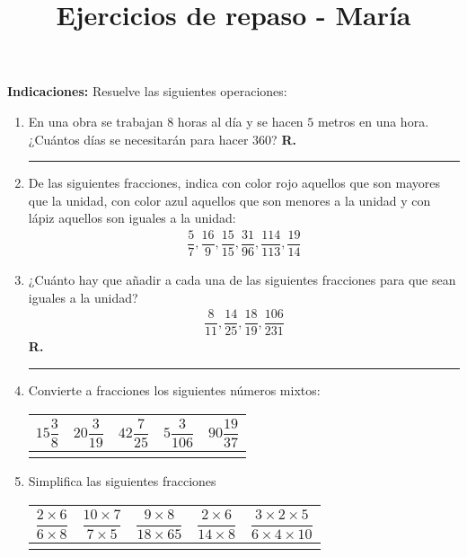 

\title{Ejercicios de repaso - María \vspace{-2cm}}
\author{}
\date{ }



\maketitle
\fontsize{14}{14}\selectfont

\textbf{Indicaciones: } Resuelve las siguientes operaciones:

\begin{enumerate}[label=\roman*)]
\item En una obra se trabajan $8$ horas al día y se hacen $5$ metros en una hora. ¿Cuántos días se necesitarán para hacer $360$?  \hspace{0.3cm} \textbf{R.} \rule{3cm}{0.1mm}
\item De las siguientes fracciones, indica con color rojo aquellos que son mayores que la unidad, con color azul aquellos que son menores a la unidad y con lápiz aquellos son iguales a la unidad:
\begin{align*}
\dfrac{5}{7}, \dfrac{16}{9}, \dfrac{15}{15}, \dfrac{31}{96},\dfrac{114}{113}, \dfrac{19}{14}  
\end{align*}
\item ¿Cuánto hay que añadir a cada una de las siguientes fracciones para que sean iguales a la unidad?
\begin{align*}
\dfrac{8}{11}, \dfrac{14}{25}, \dfrac{18}{19}, \dfrac{106}{231}  
\end{align*}
\hspace{0.3cm} \textbf{R.} \rule{3cm}{0.1mm}
\item Convierte a fracciones los siguientes números mixtos:
\begin{table}[H]
\centering
\def\arraystretch{2}
\setlength{\tabcolsep}{18pt}
\begin{tabular}{ | c | c | c | c | c | } 
\hline
$15 \dfrac{3}{8}$ & $20 \dfrac{3}{19}$ & $42 \dfrac{7}{25}$ & $5 \dfrac{3}{106}$ & $90 \dfrac{19}{37}$ \\ \hline
 & & & & \\ \hline  
\end{tabular}
\end{table}
\item Simplifica las siguientes fracciones
\begin{table}[H]
\centering
\def\arraystretch{2}
\setlength{\tabcolsep}{18pt}
\begin{tabular}{ | c | c | c | c | c | } 
\hline
$\dfrac{2 \times 6}{6 \times 8}$ & $\dfrac{10 \times 7}{7 \times 5}$ & $\dfrac{9 \times 8}{18 \times 65}$ & $\dfrac{2 \times 6}{14 \times 8}$ & $\dfrac{3 \times 2 \times 5}{6 \times 4 \times 10}$ \\ \hline
 & & & & \\ \hline  
\end{tabular}
\end{table}
\end{enumerate}


